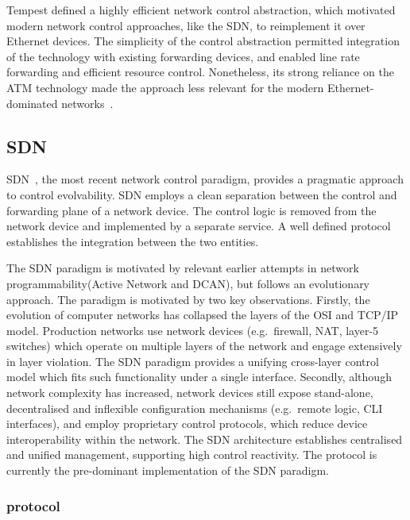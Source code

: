 Tempest defined a highly efficient network control abstraction, which motivated
modern network control approaches, like the SDN, to reimplement it over Ethernet
devices.  The simplicity of the control abstraction permitted
integration of the technology with existing forwarding devices, and enabled line
rate forwarding and efficient resource control.  Nonetheless, its strong
reliance on the ATM technology made the approach less relevant for the modern
Ethernet-dominated networks~. 

\subsection{SDN}\label{sec:background:sdn} 

SDN~, the most recent network control paradigm, provides a pragmatic
approach to control evolvability. SDN employs  a clean separation between the
control and forwarding plane of a network device. The control logic is
removed from the network device and implemented by a separate service.  A well
defined protocol establishes the integration between the two entities. 

The SDN paradigm is motivated by relevant earlier attempts in network
programmability(Active Network and DCAN), but follows an evolutionary approach.
The paradigm is motivated by two key observations.  Firstly, the evolution of
computer networks has collapsed the layers of the OSI and TCP/IP model.
Production networks use network devices (e.g.~firewall, NAT, layer-5 switches)
which operate on multiple layers of the network and engage extensively in layer
violation.  The SDN paradigm provides a unifying cross-layer control model which
fits such functionality under a single interface.  Secondly, although network
complexity has increased, network devices still expose stand-alone,
decentralised and inflexible configuration mechanisms (e.g.~remote logic, CLI
interfaces), and employ proprietary control protocols, which reduce device
interoperability within the network. The SDN architecture establishes
centralised and unified management, supporting high control reactivity.  The \of
protocol is currently the pre-dominant implementation of the SDN paradigm.

\subsubsection*{\of protocol} 

